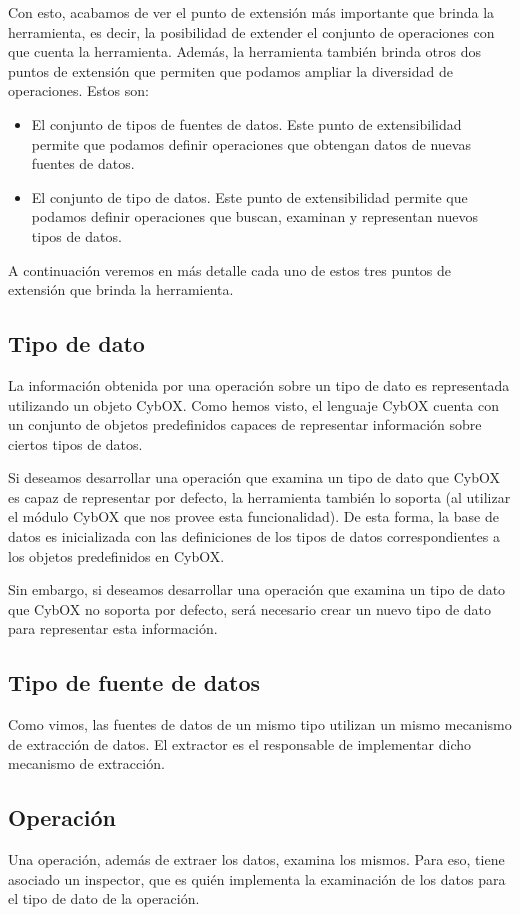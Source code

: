 Con esto, acabamos de ver el punto de extensión más importante que brinda la herramienta, es decir, la posibilidad de extender el conjunto de operaciones con que cuenta la herramienta. Además, la herramienta también brinda otros dos puntos de extensión que permiten que podamos ampliar la diversidad de operaciones. Estos son:
\begin{itemize}
\item El conjunto de tipos de fuentes de datos. Este punto de extensibilidad permite que podamos definir operaciones que obtengan datos de nuevas fuentes de datos.
\item El conjunto de tipo de datos. Este punto de extensibilidad permite que podamos definir operaciones que buscan, examinan y representan nuevos tipos de datos.
\end{itemize}

A continuación veremos en más detalle cada uno de estos tres puntos de extensión que brinda la herramienta.

\subsection{Tipo de dato}
La información obtenida por una operación sobre un tipo de dato es representada utilizando un objeto CybOX. Como hemos visto, el lenguaje CybOX cuenta con un conjunto de objetos predefinidos capaces de representar información sobre ciertos tipos de datos.

Si deseamos desarrollar una operación que examina un tipo de dato que CybOX es capaz de representar por defecto, la herramienta también lo soporta (al utilizar el módulo CybOX que nos provee esta funcionalidad). De esta forma, la base de datos es inicializada con las definiciones de los tipos de datos correspondientes a los objetos predefinidos en CybOX.

Sin embargo, si deseamos desarrollar una operación que examina un tipo de dato que CybOX no soporta por defecto, será necesario crear un nuevo tipo de dato para representar esta información.

\subsection{Tipo de fuente de datos}
Como vimos, las fuentes de datos de un mismo tipo utilizan un mismo mecanismo de extracción de datos. El extractor es el responsable de implementar dicho mecanismo de extracción.

\subsection{Operación}
Una operación, además de extraer los datos, examina los mismos. Para eso, tiene asociado un inspector, que es quién implementa la examinación de los datos para el tipo de dato de la operación.
